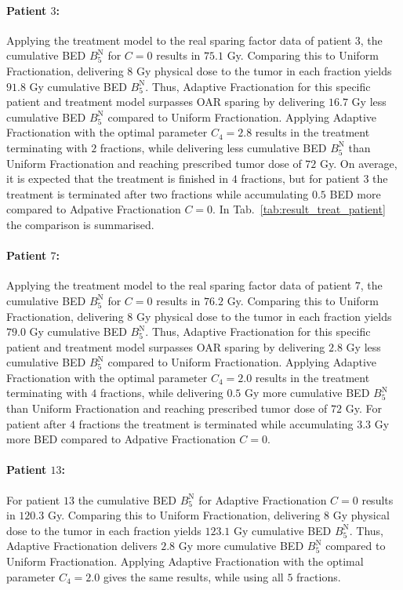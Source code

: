 \documentclass[\relativeRoot/ada.tex]{subfiles}
\begin{document}
\paragraph{Patient $3$:} Applying the treatment model to the real sparing factor data of patient $3$, the cumulative BED $B_5^{\text{N}}$ for $C=0$ results in $75.1$ Gy. Comparing this to Uniform Fractionation, delivering $8$ Gy physical dose to the tumor in each fraction yields $91.8$ Gy cumulative BED $B_5^{\text{N}}$. Thus, Adaptive Fractionation for this specific patient and treatment model surpasses OAR sparing by delivering $16.7$ Gy less cumulative BED $B_5^{\text{N}}$ compared to Uniform Fractionation. Applying Adaptive Fractionation with the optimal parameter $C_4=2.8$ results in the treatment terminating with $2$ fractions, while delivering less cumulative BED $B_5^{\text{N}}$ than Uniform Fractionation and reaching prescribed tumor dose of $72$ Gy. On average, it is expected that the treatment is finished in $4$ fractions, but for patient $3$ the treatment is terminated after two fractions while accumulating $0.5$ BED more compared to Adpative Fractionation $C=0$. In Tab.~\ref{tab:result_treat_patient} the comparison is summarised.

\paragraph{Patient $7$:} Applying the treatment model to the real sparing factor data of patient $7$, the cumulative BED $B_5^{\text{N}}$ for $C=0$ results in $76.2$ Gy. Comparing this to Uniform Fractionation, delivering $8$ Gy physical dose to the tumor in each fraction yields $79.0$ Gy cumulative BED $B_5^{\text{N}}$. Thus, Adaptive Fractionation for this specific patient and treatment model surpasses OAR sparing by delivering $2.8$ Gy less cumulative BED $B_5^{\text{N}}$ compared to Uniform Fractionation. Applying Adaptive Fractionation with the optimal parameter $C_4=2.0$ results in the treatment terminating with $4$ fractions, while delivering $0.5$ Gy more cumulative BED $B_5^{\text{N}}$ than Uniform Fractionation and reaching prescribed tumor dose of $72$ Gy. For patient after $4$ fractions the treatment is terminated while accumulating $3.3$ Gy more BED compared to Adpative Fractionation $C=0$.

\paragraph{Patient $13$:} For patient $13$ the cumulative BED $B_5^{\text{N}}$ for Adaptive Fractionation $C=0$ results in $120.3$ Gy. Comparing this to Uniform Fractionation, delivering $8$ Gy physical dose to the tumor in each fraction yields $123.1$ Gy cumulative BED $B_5^{\text{N}}$. Thus, Adaptive Fractionation delivers $2.8$ Gy more cumulative BED $B_5^{\text{N}}$ compared to Uniform Fractionation. Applying Adaptive Fractionation with the optimal parameter $C_4=2.0$ gives the same results, while using all $5$ fractions.
\end{document}
